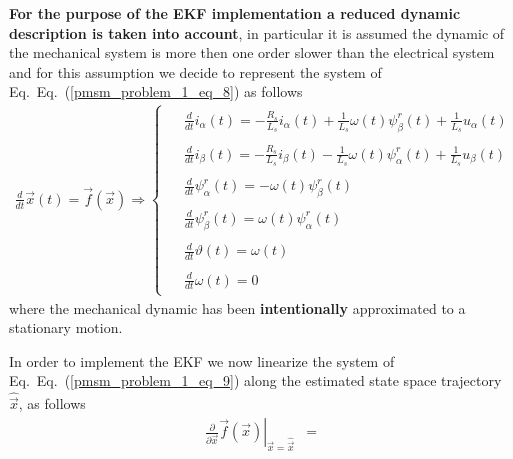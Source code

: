\documentclass[11pt,a4paper]{scrartcl}
\numberwithin{equation}{section}
\theoremstyle{it}
\theoremstyle{definition}
\renewcommand{\eqref}[1]{Eq.~(\ref{#1})}
\begin{document}
\begin{onehalfspace}
\vspace{5mm}
\textbf{For the purpose of the EKF implementation a reduced dynamic description is 
	taken into account}, in particular it is assumed the dynamic of the mechanical 
system is more then one order slower than the electrical system and for this 
assumption we decide to represent the system of Eq.~\eqref{pmsm_problem_1_eq_8} as follows
\begin{align}\label{pmsm_problem_1_eq_9}
	\frac{d}{dt}\vec{x}(t)=\vec{f}(\vec{x})\Rightarrow\left\lbrace 
	\begin{aligned}
		\begin{split}
			&\frac{d}{dt}i_\alpha(t) = -\frac{R_s}{L_s}i_\alpha(t) + 	
			\frac{1}{L_s}\omega(t)\psi_\beta^r(t) + \frac{1}{L_s} u_\alpha(t) 
		\end{split}	\\[6pt]
		\begin{split}
			&\frac{d}{dt}i_\beta(t) = -\frac{R_s}{L_s}i_\beta(t) - 	
			\frac{1}{L_s}\omega(t)\psi_\alpha^r(t) + \frac{1}{L_s} u_\beta(t)	
		\end{split}	\\[6pt]
		\begin{split}
			&\frac{d}{dt}\psi_\alpha^r(t) = -\omega(t)\psi_\beta^r(t)
		\end{split}	\\[6pt]
		\begin{split}	
			&\frac{d}{dt}\psi_\beta^r(t) = \omega(t)\psi_\alpha^r(t)	
		\end{split}	\\[6pt]
		\begin{split}
			&\frac{d}{dt}\vartheta(t) = \omega(t)
		\end{split}	\\[6pt]
		\begin{split}
			&\frac{d}{dt}\omega(t) = 0
		\end{split}
	\end{aligned}\right. 
\end{align}
where the mechanical dynamic has been \textbf{intentionally} approximated to a 
stationary motion.
\begin{mybox}
	In order to implement the EKF we now linearize the system of Eq.~\eqref{pmsm_problem_1_eq_9} along the estimated state space trajectory $\hat{\vec{x}}$, as follows
	\begin{equation}\label{pmsm_problem_1_eq_10}
		\begin{aligned}
			\left.\frac{\partial}{\partial 
				\vec{x}}\vec{f}(\vec{x})\right|_{\vec{x}=\hat{\vec{x}}} &= 

\end{aligned}
\end{equation}
\end{mybox}
\end{onehalfspace}
\end{document}
